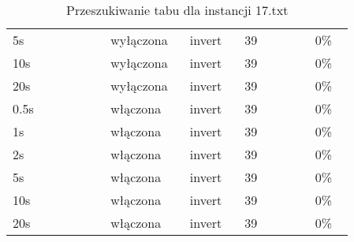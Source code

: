 \documentclass[12pt,a4paper,titlepage]{article}
\begin{document}
\begin{table}[H]
{\begin{tabular}{|p{0.25\linewidth}p{0.19\linewidth}p{0.14\linewidth}p{0.18\linewidth}p{0.1\linewidth}|}
        5s & wyłączona & invert & 39 & 0\% \\
        10s & wyłączona & invert & 39 & 0\% \\
        20s & wyłączona & invert & 39 & 0\% \\
        \hline
        0.5s & włączona & invert & 39 & 0\% \\
        1s & włączona & invert & 39 & 0\% \\
        2s & włączona & invert & 39 & 0\% \\
        5s & włączona & invert & 39 & 0\% \\
        10s & włączona & invert & 39 & 0\% \\
        20s & włączona & invert & 39 & 0\% \\
        \hline
	\end{tabular}}
	\caption{Przeszukiwanie tabu dla instancji 17.txt}
\end{table}
\end{document}
